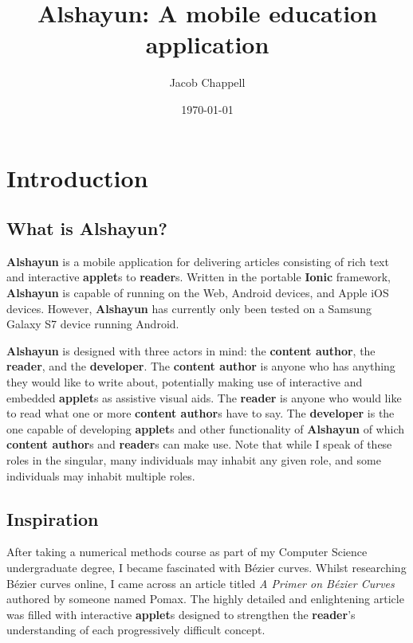 \documentclass[12pt]{report}
\begin{document}
\title{Alshayun: A mobile education application}
\author{Jacob Chappell}
\date{\today}
\maketitle

\tableofcontents


\chapter{Introduction}

    \section{What is Alshayun?}

\textbf{Alshayun} is a mobile application for delivering articles consisting of
rich text and interactive \textbf{applet}s to \textbf{reader}s. Written in the
portable \textbf{Ionic} framework, \textbf{Alshayun} is capable of running on
the Web, Android devices, and Apple iOS devices. However, \textbf{Alshayun} has
currently only been tested on a Samsung Galaxy S7 device running Android.

\textbf{Alshayun} is designed with three actors in mind: the \textbf{content
author}, the \textbf{reader}, and the \textbf{developer}. The \textbf{content
author} is anyone who has anything they would like to write about, potentially
making use of interactive and embedded \textbf{applet}s as assistive visual
aids. The \textbf{reader} is anyone who would like to read what one or more
\textbf{content author}s have to say. The \textbf{developer} is the one capable of
developing \textbf{applet}s and other functionality of \textbf{Alshayun} of
which \textbf{content author}s and \textbf{reader}s can make use. Note that
while I speak of these roles in the singular, many individuals may inhabit any
given role, and some individuals may inhabit multiple roles.

    \section{Inspiration}

After taking a numerical methods course as part of my Computer Science
undergraduate degree, I became fascinated with Bézier curves. Whilst researching
Bézier curves online, I came across an article titled \textit{A Primer on Bézier
Curves} \cite{pomax} authored by someone named Pomax. The highly detailed and
enlightening article was filled with interactive \textbf{applet}s designed to
strengthen the \textbf{reader}'s understanding of each progressively difficult
concept.
\end{document}

